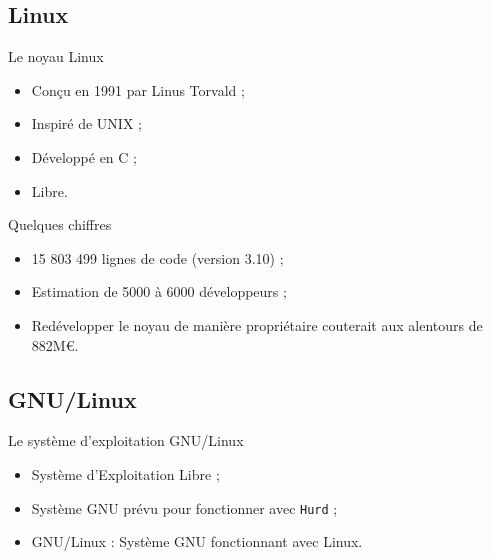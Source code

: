 \subsection{Linux}

\begin{frame}{Le noyau Linux}
  \begin{itemize}
    \item Conçu en 1991 par Linus Torvald ;
    \item Inspiré de UNIX ;
    \item Développé en C ;
    \item Libre.
  \end{itemize}
\end{frame}

\begin{frame}{Quelques chiffres}
  \begin{itemize}
    \item 15 803 499 lignes de code (version 3.10) ;
    \item Estimation de 5000 à 6000 développeurs ;
    \item Redévelopper le noyau de manière propriétaire couterait aux alentours de 882M€.
  \end{itemize}
\end{frame}

\subsection{GNU/Linux}

\begin{frame}{Le système d'exploitation GNU/Linux}
  \begin{itemize}
    \item Système d'Exploitation Libre ;
    \item Système GNU prévu pour fonctionner avec \texttt{Hurd} ;
    \item GNU/Linux : Système GNU fonctionnant avec Linux.
  \end{itemize}
\end{frame}


